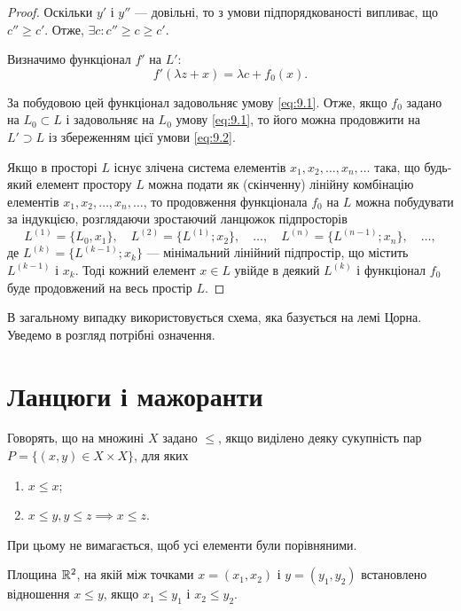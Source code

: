 \begin{proof}
Оскільки $y'$ і $y''$ --- довільні, то з умови підпорядкованості
випливає, що $c'' \ge c'$. Отже, $\exists c: c'' \ge c \ge c'$.

Визначимо функціонал $f'$ на $L'$:
\begin{equation*}
    f'(\lambda z + x) = \lambda c + f_0(x).
\end{equation*}

За побудовою цей функціонал задовольняє умову \eqref{eq:9.1}. Отже,
якщо $f_0$ задано на $L_0 \subset L$ і задовольняє на $L_0$ умову \eqref{eq:9.1}, то
його можна продовжити на $L' \supset L$ із збереженням цієї умови \eqref{eq:9.2}.

Якщо в просторі $L$ існує злічена система елементів
$x_1, x_2, \dots, x_n, \dots$ така, що будь-який елемент простору $L$ можна
подати як (скінченну) лінійну комбінацію елементів $x_1, x_2, \dots, x_n, \dots$, то
продовження функціонала $f_0$ на $L$ можна побудувати за
індукцією, розглядаючи зростаючий ланцюжок підпросторів
\begin{equation*}
    L^{(1)} = \{L_0, x_1\}, \quad L^{(2)} = \{L^{(1)}; x_2\}, \quad \dots, \quad L^{(n)} = \{L^{(n - 1)}; x_n\}, \quad \dots,
\end{equation*}
де $L^{(k)} = \{L^{(k - 1)}; x_k\}$ --- мінімальний лінійний підпростір, що
містить $L^{(k - 1)}$ і $x_k$. Тоді кожний елемент $x \in L$ увійде в
деякий $L^{(k)}$ і функціонал $f_0$ буде продовжений на весь
простір $L$. 
\end{proof}

В загальному випадку використовується схема,
яка базується на лемі Цорна. Уведемо в розгляд потрібні
означення.

\section{Ланцюги і мажоранти}

\begin{definition}
Говорять, що на множині $X$ задано  $\le$, якщо виділено деяку сукупність пар
$P = \{(x, y) \in X \times X\}$, для яких
\begin{enumerate}
    \item $x \le x$;
    \item $x \le y, y \le z \implies x \le z$.
\end{enumerate}
При цьому не вимагається, щоб усі елементи були порівняними.
\end{definition}

\begin{example}
Площина $\mathbb{R}^2$, на якій між точками
$x = (x_1, x_2)$ і $y = (y_1, y_2)$
встановлено відношення $x \le y$, якщо
$x_1 \le y_1$ і $x_2 \le y_2$.
\end{example}

